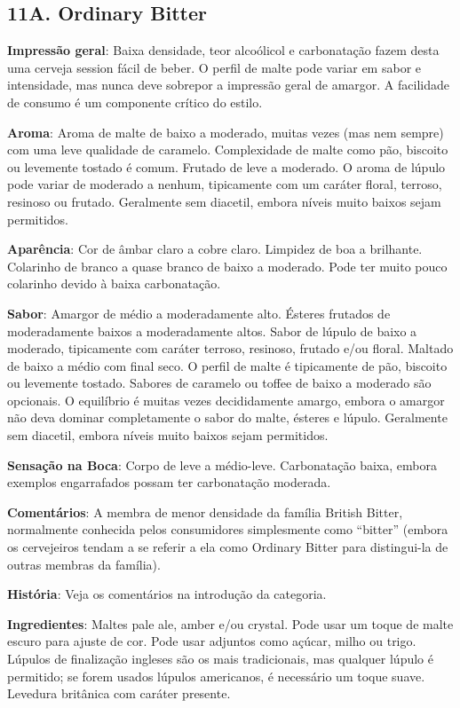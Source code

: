 \subsection*{11A. Ordinary Bitter}
\textbf{Impressão geral}: Baixa densidade, teor alcoólicol e carbonatação fazem desta uma cerveja session fácil de beber. O perfil de malte pode variar em sabor e intensidade, mas nunca deve sobrepor a impressão geral de amargor. A facilidade de consumo é um componente crítico do estilo.

\textbf{Aroma}: Aroma de malte de baixo a moderado, muitas vezes (mas nem sempre) com uma leve qualidade de caramelo. Complexidade de malte como pão, biscoito ou levemente tostado é comum. Frutado de leve a moderado. O aroma de lúpulo pode variar de moderado a nenhum, tipicamente com um caráter floral, terroso, resinoso ou frutado. Geralmente sem diacetil, embora níveis muito baixos sejam permitidos.

\textbf{Aparência}: Cor de âmbar claro a cobre claro. Limpidez de boa a brilhante. Colarinho de branco a quase branco de baixo a moderado. Pode ter muito pouco colarinho devido à baixa carbonatação.

\textbf{Sabor}: Amargor de médio a moderadamente alto. Ésteres frutados de moderadamente baixos a moderadamente altos. Sabor de lúpulo de baixo a moderado, tipicamente com caráter terroso, resinoso, frutado e/ou floral. Maltado de baixo a médio com final seco. O perfil de malte é tipicamente de pão, biscoito ou levemente tostado. Sabores de caramelo ou toffee de baixo a moderado são opcionais. O equilíbrio é muitas vezes decididamente amargo, embora o amargor não deva dominar completamente o sabor do malte, ésteres e lúpulo. Geralmente sem diacetil, embora níveis muito baixos sejam permitidos.

\textbf{Sensação na Boca}: Corpo de leve a médio-leve. Carbonatação baixa, embora exemplos engarrafados possam ter carbonatação moderada.

\textbf{Comentários}: A membra de menor densidade da família British Bitter, normalmente conhecida pelos consumidores simplesmente como “bitter” (embora os cervejeiros tendam a se referir a ela como Ordinary Bitter para distingui-la de outras membras da família).

\textbf{História}: Veja os comentários na introdução da categoria.

\textbf{Ingredientes}: Maltes pale ale, amber e/ou crystal. Pode usar um toque de malte escuro para ajuste de cor. Pode usar adjuntos como açúcar, milho ou trigo. Lúpulos de finalização ingleses são os mais tradicionais, mas qualquer lúpulo é permitido; se forem usados lúpulos americanos, é necessário um toque suave. Levedura britânica com caráter presente.

